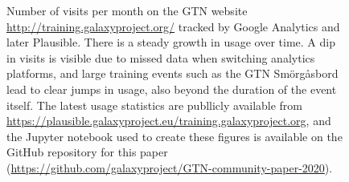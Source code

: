 \documentclass[10pt,letterpaper]{article}
\begin{document}
\begin{figure}[!ht]
\begin{subfigure}[b]{0.45\textwidth}
    \end{subfigure}
	\caption{Number of visits per month on the GTN website \url{http://training.galaxyproject.org/} tracked by Google Analytics and later Plausible. There is a steady growth in usage over time. A dip in visits is visible due to missed data when switching analytics platforms, and large training events such as the GTN Smörgåsbord lead to clear jumps in usage, also beyond the duration of the event itself. 
	The latest usage statistics are publlicly available from \url{https://plausible.galaxyproject.eu/training.galaxyproject.org}, and the Jupyter notebook used to create these figures is available on the GitHub repository for this paper (\url{https://github.com/galaxyproject/GTN-community-paper-2020}).}
	\label{fig:visits}
\end{figure}

\clearpage
\end{document}
